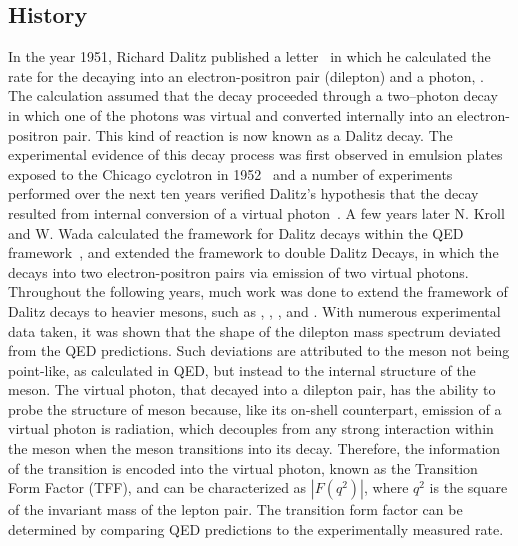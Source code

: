 \subsection{History}
\indent In the year 1951, Richard Dalitz published a letter~\cite{Dalitz} in which he calculated the rate for the \pizT  decaying into an electron-positron pair (dilepton) and a photon, \pizDal. The calculation assumed that the decay proceeded through a two–photon decay in which one of the photons was virtual and converted internally into an electron-positron pair.  This kind of reaction is now known as a Dalitz decay. The experimental evidence of this decay process was first observed in emulsion plates exposed to the Chicago cyclotron in 1952~\cite{Lord} and a number of experiments performed over the next ten years verified Dalitz’s hypothesis that the \pizDal decay resulted from internal conversion of a virtual photon~\cite{Samios,Lindenfeld,Sargent}. A few years later N. Kroll and W. Wada calculated the framework for Dalitz decays within the QED framework~\cite{KrollWada}, and extended the framework to double Dalitz Decays, in which the \pizT decays into two electron-positron pairs via emission of two virtual photons. Throughout the following years, much work was done to extend the framework of Dalitz decays to heavier mesons, such as \etaT, \omT, \etaTP, and \phiT. With numerous experimental data taken, it was shown that the shape of the dilepton mass spectrum deviated from the QED predictions. Such deviations are attributed to the meson not being point-like, as calculated in QED, but instead to the internal structure of the meson. The virtual photon, that decayed into a dilepton pair, has the ability to probe the structure of meson because, like its on-shell counterpart, emission of a  virtual photon is radiation, which decouples from any strong interaction within the meson when the meson transitions into its decay. Therefore, the information of the transition is encoded into the virtual photon, known as the Transition Form Factor (TFF), and can be characterized as $\left| F(q^2)\right|$, where $q^2$ is the square of the invariant mass of the lepton pair.  The transition form factor can be determined by comparing QED predictions to the experimentally measured rate.

